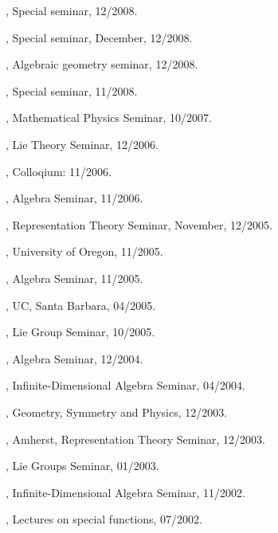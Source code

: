 \documentclass[11pt]{amsart}
\theoremstyle{plain}
\theoremstyle{definition}
\theoremstyle{remark}
\begin{document}
, Special seminar, 12/2008.

, Special seminar, December, 12/2008.

, Algebraic geometry seminar, 12/2008.

, Special seminar, 11/2008.




, Mathematical
Physics Seminar, 10/2007.

, Lie Theory
Seminar, 12/2006.

, Colloqium:
11/2006.

, Algebra
Seminar, 11/2006.

,
Representation Theory Seminar, November, 12/2005.

, University of Oregon,
11/2005.



, Algebra Seminar,
11/2005.

, UC, Santa Barbara, 04/2005.

, Lie Group Seminar, 10/2005.

, Algebra Seminar, 12/2004.


, Infinite-Dimensional Algebra Seminar, 04/2004.

, Geometry, Symmetry and Physics,
12/2003.

, Amherst,
Representation Theory
          Seminar, 12/2003.

, Lie Groups Seminar, 01/2003.



, Infinite-Dimensional Algebra Seminar,
11/2002.

, Lectures on special
functions, 07/2002.
\end{document}
